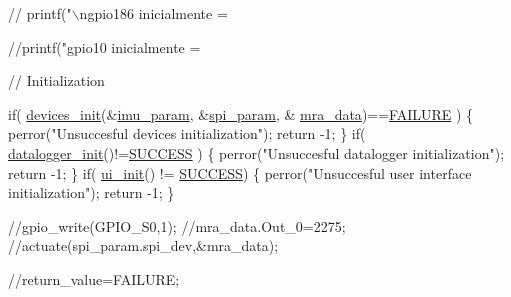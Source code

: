 \begin{DoxyCode}
  
   \textcolor{comment}{// printf("\(\backslash\)ngpio186 inicialmente = %
  \textcolor{comment}{//printf("gpio10 inicialmente = %
  
\textcolor{comment}{// Initialization}

  \textcolor{keywordflow}{if}( \hyperlink{communication_01_07C_xC3_xB3pia_01em_01conflito_01de_01Andr_xC3_xA9_01Carvalho_012013-04-26_08_8c_adfe7e60b85fe68542adde08e59151441}{devices\_init}(&\hyperlink{main2_01_07C_xC3_xB3pia_01em_01conflito_01de_01Caio_01Gustavo_01Mesquita_01Angelo_012013-04-28_08_8c_a9c6b2109fb9402446f92995db60951b5}{imu\_param}, &\hyperlink{main2_01_07C_xC3_xB3pia_01em_01conflito_01de_01Caio_01Gustavo_01Mesquita_01Angelo_012013-04-28_08_8c_adec2468b88cf50b20e5cf399a3b7e994}{spi\_param}, &
      \hyperlink{main2_01_07C_xC3_xB3pia_01em_01conflito_01de_01Caio_01Gustavo_01Mesquita_01Angelo_012013-04-28_08_8c_abc42e18d2909e9bc119316283f4ed9db}{mra\_data})==\hyperlink{communication_01_07C_xC3_xB3pia_01em_01conflito_01de_01Caio_01Gustavo_01Mesquita_01Angelo_012013-04-28_08_8h_a6d58f9ac447476b4e084d7ca383f5183}{FAILURE} )
  \{
    perror(\textcolor{stringliteral}{"Unsuccesful devices initialization"});
    \textcolor{keywordflow}{return} -1;
  \}
  \textcolor{keywordflow}{if}( \hyperlink{datalogger_01_07Caio-PC's_01conflicted_01copy_012012-11-23_08_8c_a1977ef253746fd8c008a3641d9822551}{datalogger\_init}()!=\hyperlink{communication_01_07C_xC3_xB3pia_01em_01conflito_01de_01Caio_01Gustavo_01Mesquita_01Angelo_012013-04-28_08_8h_aa90cac659d18e8ef6294c7ae337f6b58}{SUCCESS} )
  \{
    perror(\textcolor{stringliteral}{"Unsuccesful datalogger initialization"});
    \textcolor{keywordflow}{return} -1;
  \}
  \textcolor{keywordflow}{if}( \hyperlink{ui_8c_ab7bfb453918dcc296ff0cea3c79453d0}{ui\_init}() != \hyperlink{communication_01_07C_xC3_xB3pia_01em_01conflito_01de_01Caio_01Gustavo_01Mesquita_01Angelo_012013-04-28_08_8h_aa90cac659d18e8ef6294c7ae337f6b58}{SUCCESS})
  \{
    perror(\textcolor{stringliteral}{"Unsuccesful user interface initialization"});
    \textcolor{keywordflow}{return} -1;
  \}

  \textcolor{comment}{//gpio\_write(GPIO\_S0,1);}
  \textcolor{comment}{//mra\_data.Out\_0=2275;}
  \textcolor{comment}{//actuate(spi\_param.spi\_dev,&mra\_data);}
 
  \textcolor{comment}{//return\_value=FAILURE;}
  
}}
\end{DoxyCode}
